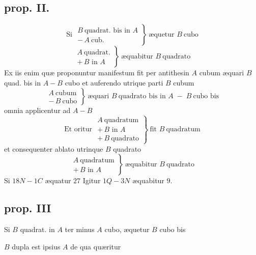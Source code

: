 \documentclass[11pt,a4paper]{article}
\begin{document}
\subsection*{prop. II.}

\[ \text{Si } \left.\begin{array}{l} B\ \text{quadrat. bis in } A \\ -\,A\ \text{cub.} \end{array}\right\}\ \text{æquetur } B\ \text{cubo} \]
\[ \left.\begin{array}{l} A\ \text{quadrat.} \\ +\,B \text{ in } A \end{array}\right\}\ \text{æquabitur } B\ \text{quadrato} \]
Ex iis enim quæ proponuntur manifestum  fit per antithesin $A$ cubum æquari $B$ quad. bis in $A - B$ cubo et auferendo utrique parti $B$ cubum
\[ \left.\begin{array}{l} A\ \text{cubum} \\ -\,B\ \text{cubo} \end{array}\right\}\ \text{æquari } B\ \text{quadrato bis in } A \;-\; B\ \text{cubo bis} \]
omnia applicentur ad $A - B$
\[ \text{Et oritur } \left.\begin{array}{l} A\ \text{quadratum} \\ +\,B \text{ in } A \\ +\,B\ \text{quadrato} \end{array}\right\}\ \text{fit } B\ \text{quadratum} \]
et consequenter ablato utrinque $B$ quadrato
\[ \left.\begin{array}{l} A\ \text{quadratum} \\ +\,B \text{ in } A \end{array}\right\}\ \text{æquabitur } B\ \text{quadrato} \]
Si $18N - 1C$ æquatur $27$ Igitur $1Q - 3N$ æquabitur $9$.

\subsection*{prop. III}

Si $B$ quadrat. in $A$ ter minus $A$ cubo, æquetur $B$ cubo bis

$B$ dupla est ipsius $A$ de qua quæritur
\end{document}
